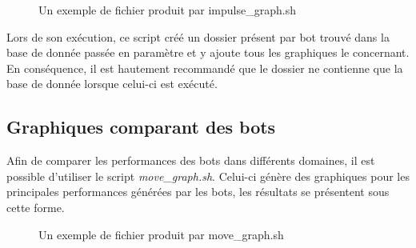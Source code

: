 \documentclass[10pt,a4paper]{report}
\begin{document}
\begin{figure}[H]
	\caption{\label{fig:impulse_graph} Un exemple de fichier produit par impulse\_graph.sh}
\end{figure}

Lors de son exécution, ce script créé un dossier présent par bot trouvé dans
la base de donnée passée en paramètre et y ajoute tous les graphiques le
concernant. En conséquence, il est hautement recommandé que le dossier ne
contienne que la base de donnée lorsque celui-ci est exécuté.

\subsection{Graphiques comparant des bots}
Afin de comparer les performances des bots dans différents domaines, il est
possible d'utiliser le script \emph{move\_graph.sh}. Celui-ci génère des
graphiques pour les principales performances générées par les bots, les
résultats se présentent sous cette forme.

\begin{figure}[H]
	\caption{\label{fig:move_graph} Un exemple de fichier produit par move\_graph.sh}
\end{figure}
\end{document}
